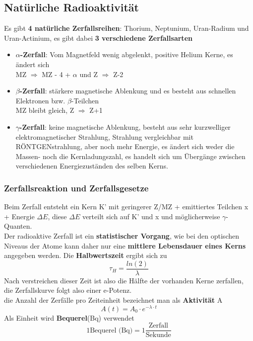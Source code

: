\documentclass[12pt,a4paper,ngerman]{article}
\begin{document}
\subsection{Natürliche Radioaktivität}
Es gibt \textbf{4 natürliche Zerfallsreihen}: Thorium, Neptunium, Uran-Radium und Uran-Actinium, es gibt dabei \textbf{3 verschiedene Zerfallsarten}
\begin{itemize}
\item \textbf{$\alpha$-Zerfall}: Vom Magnetfeld wenig abgelenkt, positive Helium Kerne, es ändert sich \\
MZ $\Rightarrow$ MZ - 4 + $\alpha$ und Z $\Rightarrow$ Z-2
\item \textbf{$\beta$-Zerfall}: stärkere magnetische Ablenkung und es besteht aus schnellen Elektronen bzw. $\beta$-Teilchen \\
MZ bleibt gleich, Z $\Rightarrow$ Z+1
\item \textbf{$\gamma$-Zerfall}: keine magnetische Ablenkung, besteht aus sehr kurzwelliger elektromagnetischer Strahlung, Strahlung vergleichbar mit RÖNTGENstrahlung, aber noch mehr Energie, es ändert sich weder die Massen- noch die Kernladungszahl, es handelt sich um Übergänge zwischen verschiedenen Energiezuständen des selben Kerns. 
\end{itemize}

\subsubsection*{Zerfallsreaktion und Zerfallsgesetze}

Beim Zerfall entsteht ein Kern K' mit geringerer Z/MZ + emittiertes Teilchen x + Energie $\Delta E$, diese $\Delta E$ verteilt sich auf K' und x und möglicherweise $\gamma$-Quanten. \\
Der radioaktive Zerfall ist ein \textbf{statistischer Vorgang}, wie bei den optischen Niveaus der Atome kann daher nur eine \textbf{mittlere Lebensdauer eines Kerns} angegeben werden. Die \textbf{Halbwertszeit} ergibt sich zu
\begin{equation}
\tau_H = \frac{ln(2)}{\lambda}
\end{equation}
Nach verstreichen dieser Zeit ist also die Hälfte der vorhanden Kerne zerfallen, die Zerfallskurve folgt also einer e-Potenz. \\
die Anzahl der Zerfälle pro Zeiteinheit bezeichnet man als \textbf{Aktivität} A
\begin{equation}
A(t) = A_0 \cdot e^{-\lambda \cdot t}
\end{equation}
Als Einheit wird \textbf{Bequerel}(Bq) verwendet
\begin{equation}
1 \text{Bequerel (Bq)} = 1\frac{\text{Zerfall}}{\text{Sekunde}}
\end{equation}
\end{document}
